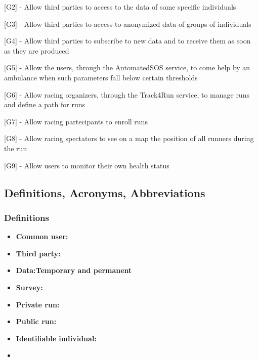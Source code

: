 \hspace{-\parindent}[G2] - Allow third parties to access to the data of some specific individuals\newline

\hspace{-\parindent}[G3] - Allow third parties to access to anonymized data of groups of individuals\newline

\hspace{-\parindent}[G4] - Allow third parties to subscribe to new data and to receive them as soon as they are produced\newline

\hspace{-\parindent}[G5] - Allow the users, through the AutomatedSOS service, to come help by an ambulance when such parameters fall below certain thresholds\newline

\hspace{-\parindent}[G6] - Allow racing organizers, through the Track4Run service, to manage runs and define a path for runs\newline

\hspace{-\parindent}[G7] - Allow racing partecipants to enroll runs\newline

\hspace{-\parindent}[G8] - Allow racing spectators to see on a map the position of all runners during the run\newline

\hspace{-\parindent}[G9] - Allow users to monitor their own health status

\subsection{Definitions, Acronyms, Abbreviations}
\subsubsection{Definitions}
\begin{itemize}
\item \textbf{Common user:} 
\item \textbf{Third party:}
\item \textbf{Data:Temporary and permanent}
\item \textbf{Survey:}
\item \textbf{Private run:}
\item \textbf{Public run:}
\item \textbf{Identifiable individual:}
\item %
\end{itemize}
